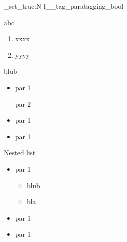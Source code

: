 \documentclass{article}
\newcommand\parataggingON {\bool_set_true:N \l__tag_paratagging_bool}
\begin{document}
\pagestyle{empty}

\parataggingON

abc

\begin{enumerate}
\item xxxx %

\item yyyy
\end{enumerate}

blub

\begin{itemize}
\item par 1

      par 2

\item par 1

\item par 1

\end{itemize}

Nested list

\begin{itemize}
\item par 1

      \begin{itemize}
      \item blub
      \item bla
      \end{itemize}

\item par 1

\item par 1

\end{itemize}

\ExplSyntaxOn
\ExplSyntaxOff

\tagstructend %
\end{document}
